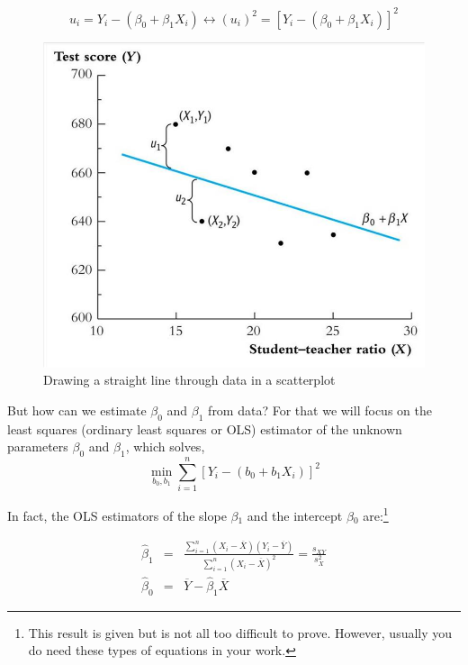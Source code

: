 \documentclass[
]{book}
\begin{document}
\begin{equation}
u_i = Y_i - (\beta_0 + \beta_1 X_i) \longleftrightarrow (u_i)^2 = \left[Y_i - (\beta_0 + \beta_1 X_i) \right]^2
\end{equation}

\begin{figure}

{\centering \includegraphics[width=600px]{./figures/Lecture1_sheet8} 

}

\caption{Drawing a straight line through data in a scatterplot}\label{fig:unire}
\end{figure}

But how can we estimate \(\beta_0\) and \(\beta_1\) from data? For that we will focus on the least squares (ordinary least squares or OLS) estimator of the unknown parameters \(\beta_0\) and \(\beta_1\), which solves,
\begin{equation}
    \min_{b_0,b_1} \sum^n_{i=1} \left[Y_i - (b_0 + b_1 X_i) \right]^2
\end{equation}

In fact, the OLS estimators of the slope \(\beta\)\(_1\) and the intercept \(\beta\)\(_0\) are:\footnote{This result is given but is not all too difficult to prove. However, usually you do need these types of equations in your work.}

\begin{eqnarray}
    \hat{\beta}_1 &=& \frac{\sum^n_{i=1}(X_i - \overline{X})(Y_i - \overline{Y})}{\sum^n_{i=1}(X_i - \overline{X})^2} = \frac{s_{XY}}{s^2_X}\\
    \hat{\beta}_0 &=& \overline{Y} - \hat{\beta}_1\overline{X}
\end{eqnarray}
\end{document}
